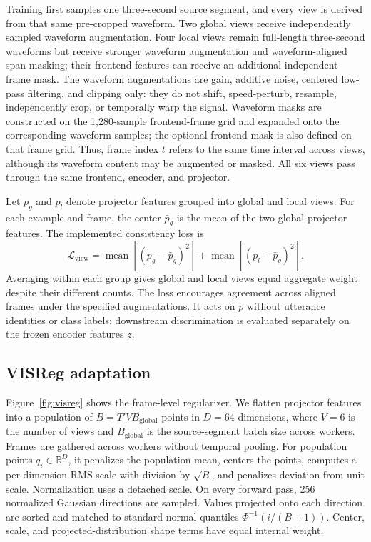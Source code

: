 \documentclass[11pt,a4paper]{article}
\begin{document}
Training first samples one three-second source segment, and every view is derived from that same pre-cropped waveform. Two global views receive independently sampled waveform augmentation. Four local views remain full-length three-second waveforms but receive stronger waveform augmentation and waveform-aligned span masking; their frontend features can receive an additional independent frame mask. The waveform augmentations are gain, additive noise, centered low-pass filtering, and clipping only: they do not shift, speed-perturb, resample, independently crop, or temporally warp the signal. Waveform masks are constructed on the 1,280-sample frontend-frame grid and expanded onto the corresponding waveform samples; the optional frontend mask is also defined on that frame grid. Thus, frame index $t$ refers to the same time interval across views, although its waveform content may be augmented or masked. All six views pass through the same frontend, encoder, and projector.

Let $p_g$ and $p_l$ denote projector features grouped into global and local views. For each example and frame, the center $\bar p_g$ is the mean of the two global projector features. The implemented consistency loss is
\begin{equation}
\mathcal{L}_{\mathrm{view}}=
\operatorname{mean}\!\left[(p_g-\bar p_g)^2\right]
+\operatorname{mean}\!\left[(p_l-\bar p_g)^2\right].
\label{eq:view}
\end{equation}
Averaging within each group gives global and local views equal aggregate weight despite their different counts. The loss encourages agreement across aligned frames under the specified augmentations. It acts on $p$ without utterance identities or class labels; downstream discrimination is evaluated separately on the frozen encoder features $z$.

\subsection{VISReg adaptation}
\label{sec:visreg}

Figure~\ref{fig:visreg} shows the frame-level regularizer. We flatten projector features into a population of $B=T'VB_{\mathrm{global}}$ points in $D=64$ dimensions, where $V=6$ is the number of views and $B_{\mathrm{global}}$ is the source-segment batch size across workers. Frames are gathered across workers without temporal pooling. For population points $q_i\in\mathbb{R}^D$, it penalizes the population mean, centers the points, computes a per-dimension RMS scale with division by $\sqrt{B}$, and penalizes deviation from unit scale. Normalization uses a detached scale. On every forward pass, 256 normalized Gaussian directions are sampled. Values projected onto each direction are sorted and matched to standard-normal quantiles $\Phi^{-1}(i/(B+1))$. Center, scale, and projected-distribution shape terms have equal internal weight.
\end{document}
